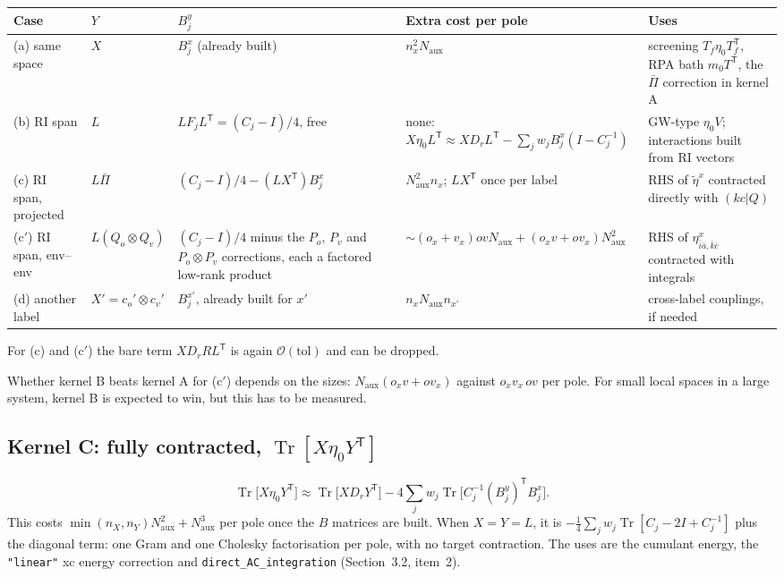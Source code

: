\documentclass[11pt,a4paper]{article}
\newcommand{\code}[1]{\texttt{\small #1}}
\newcommand{\Naux}{N_{\mathrm{aux}}}
\newcommand{\ov}{ov}
\newcommand{\Tr}{\operatorname{Tr}}
\begin{document}
\begin{center}
\small
\begin{tabularx}{\textwidth}{@{}>{\raggedright\arraybackslash}p{1.9cm}>{\raggedright\arraybackslash}p{1.8cm}>{\raggedright\arraybackslash}p{3.9cm}>{\raggedright\arraybackslash}p{3.2cm}L@{}}
\toprule
Case & $Y$ & $B_j^y$ & Extra cost per pole & Uses \\
\midrule
(a) same space & $X$ & $B_j^x$ (already built) & $n_x^2\Naux$
  & screening $T_f\eta_0T_f^{\mathsf T}$, RPA bath $m_0T^{\mathsf T}$, the $\bar\Pi$ correction in kernel A \\
(b) RI span & $L$ & $LF_jL^{\mathsf T}=(C_j-I)/4$, free
  & none: $X\eta_0L^{\mathsf T}\approx XD_rL^{\mathsf T}-\sum_jw_jB_j^x(I-C_j^{-1})$
  & GW-type $\eta_0V$; interactions built from RI vectors \\
(c) RI span, projected & $L\bar\Pi$ & $(C_j-I)/4-(LX^{\mathsf T})B_j^x$
  & $\Naux^2n_x$; $LX^{\mathsf T}$ once per label
  & RHS of $\tilde\eta^x$ contracted directly with $(kc|Q)$ \\
(c$'$) RI span, env--env & $L(Q_o\otimes Q_v)$
  & $(C_j-I)/4$ minus the $P_o$, $P_v$ and $P_o\otimes P_v$ corrections, each a factored low-rank product
  & ${\sim}(o_x+v_x)\ov\Naux + (o_xv+ov_x)\Naux^2$
  & RHS of $\eta^x_{\bar i\bar a,\bar k\bar c}$ contracted with integrals \\
(d) another label & $X'=c_o'\otimes c_v'$ & $B_j^{x'}$, already built for $x'$ & $n_x\Naux n_{x'}$
  & cross-label couplings, if needed \\
\bottomrule
\end{tabularx}
\end{center}

For (c) and (c$'$) the bare term $XD_rRL^{\mathsf T}$ is again $\mathcal{O}(\mathrm{tol})$ and
can be dropped.

Whether kernel B beats kernel A for (c$'$) depends on the sizes:
$\Naux(o_xv+ov_x)$ against $o_xv_x\,ov$ per pole. For small local spaces in a large system,
kernel B is expected to win, but this has to be measured.

\subsection{Kernel C: fully contracted, $\Tr[X\eta_0Y^{\mathsf T}]$}

\begin{equation}
  \Tr\big[X\eta_0Y^{\mathsf T}\big] \approx \Tr\big[XD_rY^{\mathsf T}\big]
   - 4\sum_jw_j\Tr\big[C_j^{-1}(B_j^y)^{\mathsf T}B_j^x\big].
\end{equation}
This costs $\min(n_X,n_Y)\Naux^2+\Naux^3$ per pole once the $B$ matrices are built. When
$X=Y=L$, it is $-\tfrac14\sum_jw_j\Tr[C_j-2I+C_j^{-1}]$ plus the diagonal term: one Gram and
one Cholesky factorisation per pole, with no target contraction. The uses are the cumulant
energy, the \code{"linear"} xc energy correction and \code{direct\_AC\_integration}
(Section~3.2, item~2).
\end{document}

